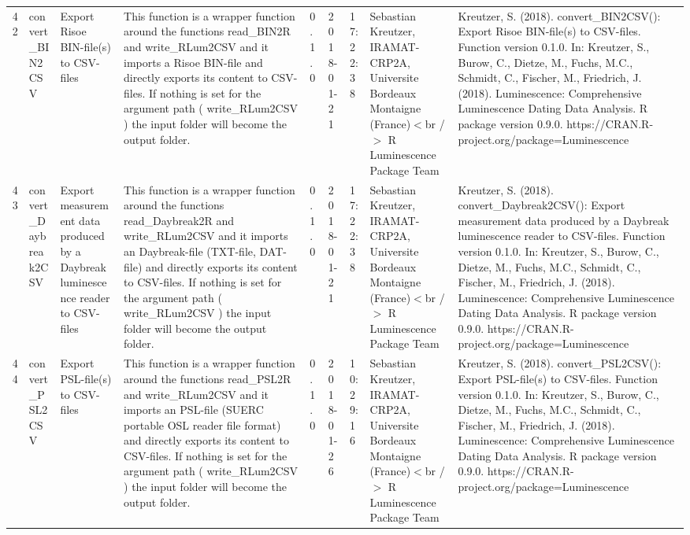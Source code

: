 \begin{table}[ht]
\begin{tabular}{rllllllll}
 \\ 
  42 & convert\_BIN2CSV & Export Risoe BIN-file(s) to CSV-files & This function is a wrapper function around the functions  read\_BIN2R  and write\_RLum2CSV  and it imports a Risoe BIN-file and directly exports its content to CSV-files. If nothing is set for the argument  path  ( write\_RLum2CSV ) the input folder will become the output folder. & 0.1.0 & 2018-01-21 & 17:22:38
 & Sebastian Kreutzer, IRAMAT-CRP2A, Universite Bordeaux Montaigne (France)$<$br /$>$  R Luminescence Package Team & Kreutzer, S. (2018). convert\_BIN2CSV(): Export Risoe BIN-file(s) to CSV-files. Function version 0.1.0. In: Kreutzer, S., Burow, C., Dietze, M., Fuchs, M.C., Schmidt, C., Fischer, M., Friedrich, J. (2018). Luminescence: Comprehensive Luminescence Dating Data Analysis. R package version 0.9.0. https://CRAN.R-project.org/package=Luminescence
 \\ 
  43 & convert\_Daybreak2CSV & Export measurement data produced by a Daybreak luminescence reader to CSV-files & This function is a wrapper function around the functions  read\_Daybreak2R  and write\_RLum2CSV  and it imports an Daybreak-file (TXT-file, DAT-file) and directly exports its content to CSV-files.  If nothing is set for the argument  path  ( write\_RLum2CSV ) the input folder will become the output folder. & 0.1.0 & 2018-01-21 & 17:22:38
 & Sebastian Kreutzer, IRAMAT-CRP2A, Universite Bordeaux Montaigne (France)$<$br /$>$  R Luminescence Package Team & Kreutzer, S. (2018). convert\_Daybreak2CSV(): Export measurement data produced by a Daybreak luminescence reader to CSV-files. Function version 0.1.0. In: Kreutzer, S., Burow, C., Dietze, M., Fuchs, M.C., Schmidt, C., Fischer, M., Friedrich, J. (2018). Luminescence: Comprehensive Luminescence Dating Data Analysis. R package version 0.9.0. https://CRAN.R-project.org/package=Luminescence
 \\ 
  44 & convert\_PSL2CSV & Export PSL-file(s) to CSV-files & This function is a wrapper function around the functions  read\_PSL2R  and write\_RLum2CSV  and it imports an PSL-file (SUERC portable OSL reader file format) and directly exports its content to CSV-files. If nothing is set for the argument  path  ( write\_RLum2CSV ) the input folder will become the output folder. & 0.1.0 & 2018-01-26 & 10:29:16
 & Sebastian Kreutzer, IRAMAT-CRP2A, Universite Bordeaux Montaigne (France)$<$br /$>$  R Luminescence Package Team & Kreutzer, S. (2018). convert\_PSL2CSV(): Export PSL-file(s) to CSV-files. Function version 0.1.0. In: Kreutzer, S., Burow, C., Dietze, M., Fuchs, M.C., Schmidt, C., Fischer, M., Friedrich, J. (2018). Luminescence: Comprehensive Luminescence Dating Data Analysis. R package version 0.9.0. https://CRAN.R-project.org/package=Luminescence

\end{tabular}
\end{table}
